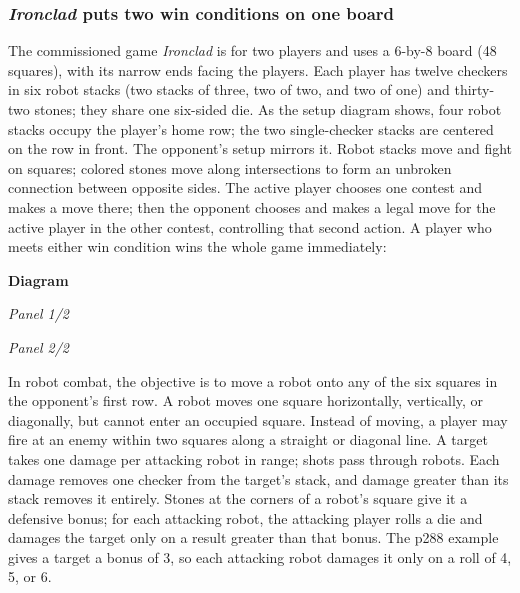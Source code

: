 \subsubsection{\texorpdfstring{\emph{Ironclad} puts two win conditions on one board}{Ironclad puts two win conditions on one board}}\label{05-engine-i-ch009-ironclad-puts-two-win-conditions-on-one-board}

\hypertarget{05-engine-i-ch009-ironclad-puts-two-win-conditions-on-one-board}{}

The commissioned game \emph{Ironclad} is for two players and uses a 6-by-8 board (48 squares), with its narrow ends facing the players. Each player has twelve checkers in six robot stacks (two stacks of three, two of two, and two of one) and thirty-two stones; they share one six-sided die. As the setup diagram shows, four robot stacks occupy the player's home row; the two single-checker stacks are centered on the row in front. The opponent's setup mirrors it. Robot stacks move and fight on squares; colored stones move along intersections to form an unbroken connection between opposite sides. The active player chooses one contest and makes a move there; then the opponent chooses and makes a legal move for the active player in the other contest, controlling that second action. A player who meets either win condition wins the whole game immediately:

\par\medskip\noindent\textbf{Diagram}\par
\par\noindent\textit{Panel 1/2}\par{}\par
\par\noindent\textit{Panel 2/2}\par{}\par

In robot combat, the objective is to move a robot onto any of the six squares in the opponent's first row. A robot moves one square horizontally, vertically, or diagonally, but cannot enter an occupied square. Instead of moving, a player may fire at an enemy within two squares along a straight or diagonal line. A target takes one damage per attacking robot in range; shots pass through robots. Each damage removes one checker from the target's stack, and damage greater than its stack removes it entirely. Stones at the corners of a robot's square give it a defensive bonus; for each attacking robot, the attacking player rolls a die and damages the target only on a result greater than that bonus. The p288 example gives a target a bonus of 3, so each attacking robot damages it only on a roll of 4, 5, or 6.

